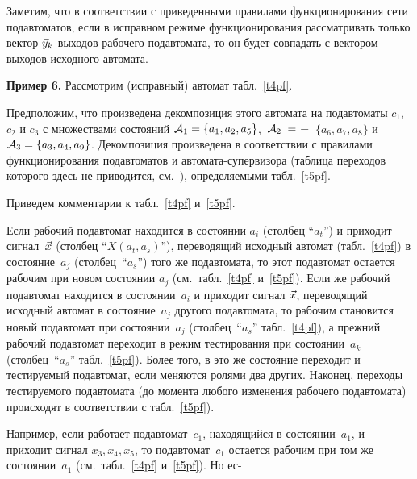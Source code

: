 \begin{multicols}{2}
Заметим, что в соответствии с приведенными правилами функционирования
сети подавтоматов, если в исправном режиме функционирования рассматривать
только вектор $\vec y_k$ выходов рабочего под\-ав\-то\-ма\-та, то он будет совпадать
с вектором выходов исходного автомата.

\medskip
\noindent
{\bf Пример 6.} Рассмотрим (исправный) автомат табл.~\ref{t4pf}.

Предположим, что произведена декомпозиция этого автомата на подавтоматы
$c_1$, $c_2$ и $c_3$ с множествами состояний ${\cal A}_1 = \{a_1,a_2,a_5\}$,\
${\cal A}_2\; =$\linebreak $=\; \{a_6,a_7,a_8\}$ и ${\cal A}_3 = \{a_3,a_4,a_9\}$.
Декомпозиция произведена в соответствии с правилами функционирования
подавтоматов и автомата-супервизора (таблица переходов которого здесь не
приводится, см.~\cite{6}), определяемыми табл.~\ref{t5pf}.


Приведем комментарии к табл.~\ref{t4pf} и~\ref{t5pf}.

Если рабочий подавтомат находится в состоянии $a_i$ (столбец ``$a_t$'') и
приходит сигнал~$\vec x$ (столбец ``$X(a_t,a_s)$''), переводящий исходный
автомат (табл.~\ref{t4pf}) в со\-сто\-яние~$a_j$ (столбец~``$a_s$'')
того же под\-ав\-то\-ма\-та, то этот подавтомат остается рабочим при новом
состоянии $a_j$ (см.\ табл.~\ref{t4pf} и~\ref{t5pf}).
Если же рабочий подавтомат находится в со\-сто\-янии~$a_i$ и приходит сигнал
$\vec x$, переводящий исходный автомат в со\-сто\-яние~$a_j$ другого подавтомата,
то рабочим становится новый подавтомат при со\-сто\-янии~$a_j$ (столбец~``$a_s$''
табл.~\ref{t4pf}), а прежний рабочий подавтомат переходит в режим тестирования при
со\-сто\-янии~$a_k$ (столбец~``$a_s$'' табл.~\ref{t5pf}).
Более того, в это же состояние переходит и тестируемый подавтомат,
если меняются ролями два других.
Наконец, переходы тестируемого подавтомата (до момента любого изменения
рабочего подавтомата) происходят в соответствии с табл.~\ref{t5pf}).


Например, если работает подавтомат~$c_1$, находящийся в со\-сто\-янии~$a_1$,
и приходит сигнал $x_3,x_4,x_5$, %
 то подавтомат~$c_1$ остается рабочим
при том же со\-сто\-янии~$a_1$ (см.\ табл.~\ref{t4pf} и~\ref{t5pf}).
Но ес-\linebreak\vspace*{-12pt}
\pagebreak

\end{multicols}

